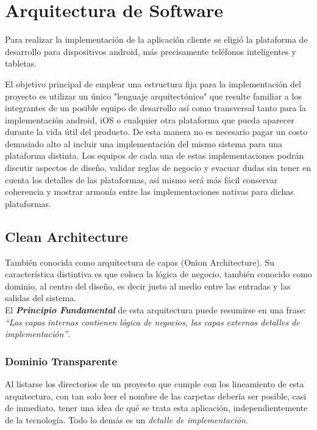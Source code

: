 \section{Arquitectura de Software}

Para realizar la implementación de la aplicación cliente se eligió la plataforma de desarrollo para dispositivos android, más precisamente teléfonos inteligentes y tabletas.

El objetivo principal de emplear una estructura fija para la implementación del proyecto es utilizar un único "lenguaje arquitectónico" que resulte familiar a los integrantes de un posible equipo de desarrollo así como transversal tanto para la implementación android, iOS o cualquier otra plataforma que pueda aparecer durante la vida útil del producto. De esta manera no es necesario pagar un costo demasiado alto al incluir una implementación del mismo sistema para una plataforma distinta. 
Los equipos de cada una de estas implementaciones podrán discutir aspectos de diseño, validar reglas de negocio y evacuar dudas sin tener en cuenta los detalles de las plataformas, así mismo será más fácil conservar coherencia y mostrar armonía entre las implementaciones nativas para dichas plataformas.

\subsection{Clean Architecture}
También conocida como arquitectura de capas (Onion Architecture). Su característica distintiva es que coloca la lógica de negocio, también conocido como dominio, al centro del diseño, es decir justo al medio entre las entradas y las salidas del sistema\cite{clean_bob}.\\

El \textbf{\emph{Principio Fundamental}}\label{text:Clean_Princ_Fund} de esta arquitectura puede resumirse en una frase: \textit{``Las capas internas contienen lógica de negocios, las capas externas detalles de implementación''}.

\subsubsection{Dominio Transparente}
Al listarse los directorios de un proyecto que cumple con los lineamiento de esta arquitectura, con tan solo leer el nombre de las carpetas debería ser posible, casi de inmediato, tener una idea de qué se trata esta aplicación, independientemente de la tecnología. Todo lo demás es un \emph{detalle de implementación}\cite{clean_five}.

